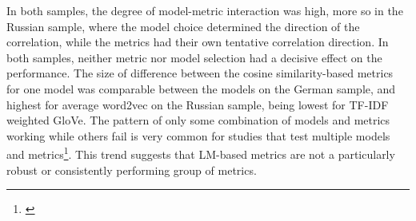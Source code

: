 In both samples, the degree of model-metric interaction was high, more so in the Russian sample, where the model choice determined the direction of the correlation, while the metrics had their own tentative correlation direction. In both samples, neither metric nor model selection had a decisive effect on the performance. The size of difference between the cosine similarity-based metrics for one model was comparable between the models on the German sample, and highest for average word2vec on the Russian sample, being lowest for TF-IDF weighted GloVe. The pattern of only some combination of models and metrics working while others fail is very common for studies that test multiple models and metrics\footnote{\cite{iter2018automatic, just2019coherence, ryazanskaya2020thesis, xu2020centroid, hitczenko2021understanding, xu2022fully, just2023validation}}. This trend suggests that LM-based metrics are not a particularly robust or consistently performing group of metrics.





